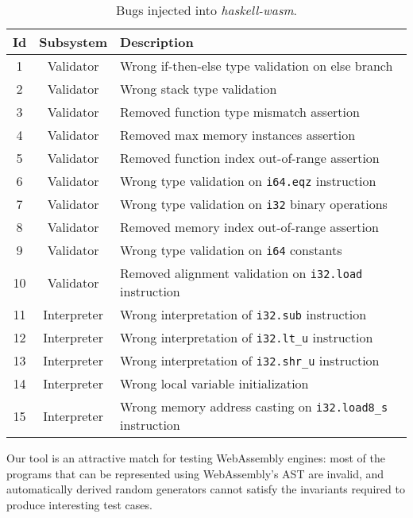 \documentclass[sigconf, anonymous, review]{acmart}
\begin{document}
\begin{table}[b]
\scriptsize
\begin{tabular}{|c|c|l|}
\hline
\textbf{Id}
& \textbf{Subsystem}
& \textbf{Description} \\
\hline
1
& Validator
& Wrong if-then-else type validation on else branch \\
\hline
2
& Validator
& Wrong stack type validation \\
\hline
3
& Validator
& Removed function type mismatch assertion \\
\hline
4
& Validator
& Removed max memory instances assertion \\
\hline
5
& Validator
& Removed function index out-of-range assertion \\
\hline
6
& Validator
& Wrong type validation on \texttt{i64.eqz} instruction \\
\hline
7
& Validator
& Wrong type validation on \texttt{i32} binary operations \\
\hline
8
& Validator
& Removed memory index out-of-range assertion \\
\hline
9
& Validator
& Wrong type validation on \texttt{i64} constants \\
\hline
10
& Validator
& Removed alignment validation on \texttt{i32.load} instruction \\
\hline
11
& Interpreter
& Wrong interpretation of \texttt{i32.sub} instruction \\
\hline
12
& Interpreter
& Wrong interpretation of \texttt{i32.lt\_u} instruction \\
\hline
13
& Interpreter
& Wrong interpretation of \texttt{i32.shr\_u} instruction \\
\hline
14
& Interpreter
& Wrong local variable initialization \\
\hline
15
& Interpreter
& Wrong memory address casting on \texttt{i32.load8\_s} instruction \\
\hline
\end{tabular}
\caption{\label{table:wasm:injectedbugs}Bugs injected into
  \textit{haskell-wasm}.}
\vspace{-10pt}
\end{table}

Our tool is an attractive match for testing WebAssembly engines:
%
%
most of the programs that can be represented using WebAssembly's AST are
invalid, and automatically derived random generators cannot satisfy the
invariants required to produce interesting test cases.
\end{document}
